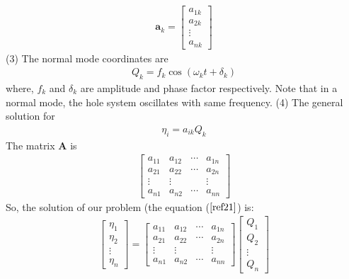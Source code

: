   \begin{align}
  \mathbf{a}_{k}=\left[\begin{array}{c}
  a_{1 k} \\
  a_{2 k} \\
  \vdots \\
  a_{n k}
  \end{array}\right]\label{ref19}
  \end{align}
  (3) The normal mode coordinates are
  \begin{align}
  Q_{k}=f_{k} \cos \left(\omega_{k} t+\delta_{k}\right)\label{ref20}
  \end{align}
  where, $f_{k}$ and $\delta_{k}$ are amplitude and phase factor respectively. Note that in a normal mode, the hole system oscillates with same frequency.
  (4) The general solution for
  \begin{align}
  \eta_{i}=a_{i k} Q_{k}\label{ref21}
  \end{align}
   The matrix $\mathbf{A}$ is 
   \begin{align}
   \left[\begin{array}{llll}a_{11} & a_{12} & \cdots & a_{1 n} \\ a_{21} & a_{22} & \cdots & a_{2 n} \\ \vdots & \vdots & & \vdots \\ a_{n 1} & a_{n 2} & \cdots & a_{n n}\end{array}\right]\label{22}
   \end{align}
  So, the solution of our problem (the equation ($\ref{ref21}$) is:
 \begin{align}
  \left[\begin{array}{l}
 \eta_{1} \\
 \eta_{2} \\
 \vdots \\
 \eta_{n}
 \end{array}\right]=\left[\begin{array}{llll}
 a_{11} & a_{12} & \cdots & a_{1 n} \\
 a_{21} & a_{22} & \cdots & a_{2 n} \\
 \vdots & \vdots & & \vdots \\
 a_{n 1} & a_{n 2} & \cdots & a_{n n}
 \end{array}\right]\left[\begin{array}{l}
 Q_{1} \\
 Q_{2} \\
 \vdots \\
 Q_{n}
 \end{array}\right] 
 \end{align}
